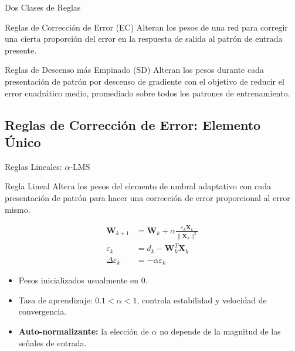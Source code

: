 \documentclass[aspectratio=169,utf8,spanish]{beamer}
\begin{document}
\begin{frame}{Dos Clases de Reglas}
  \begin{block}{Reglas de Corrección de Error (EC)}
    Alteran los pesos de una red para corregir una cierta proporción del error en la respuesta de salida al patrón de entrada presente.
  \end{block}

  \begin{block}{Reglas de Descenso más Empinado (SD)}
    Alteran los pesos durante cada presentación de patrón por descenso de gradiente con el objetivo de reducir el error cuadrático medio, promediado sobre todos los patrones de entrenamiento.
  \end{block}
\end{frame}


\subsection{Reglas de Corrección de Error: Elemento Único}

\begin{frame}{Reglas Lineales: $\alpha$-LMS}
  \begin{block}{Regla Lineal}
    Altera los pesos del elemento de umbral adaptativo con cada presentación de patrón para hacer una corrección de error proporcional al error mismo.
  \end{block}

  \begin{align*}
    \mathbf{W}_{k+1} &= \mathbf{W}_k + \alpha \frac{\varepsilon_k \mathbf{X}_k}{\|\mathbf{X}_k\|^2} \\[4pt]
    \varepsilon_k &= d_k - \mathbf{W}_k^T \mathbf{X}_k \\[4pt]
    \Delta\varepsilon_k &= -\alpha\varepsilon_k
  \end{align*}

  \begin{itemize}
    \item Pesos inicializados usualmente en $0$.
    \item Tasa de aprendizaje: $0.1 < \alpha < 1$, controla estabilidad y velocidad de convergencia.
    \item \textbf{Auto-normalizante:} la elección de $\alpha$ no depende de la magnitud de las señales de entrada.
  \end{itemize}
\end{frame}
\end{document}
